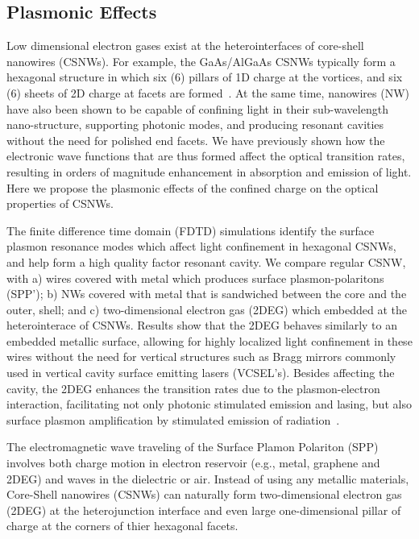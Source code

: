 \subsection{Plasmonic Effects}

Low dimensional electron gases exist at the heterointerfaces of core-shell
nanowires (CSNWs). For example, the GaAs/AlGaAs CSNWs typically form a
hexagonal structure in which six (6) pillars of 1D charge at the vortices, and
six (6) sheets of 2D charge at facets are formed~\cite{Wang:2015hz}. At the
same time, nanowires (NW) have also been shown to be capable of confining light
in their sub-wavelength nano-structure, supporting photonic modes, and
producing resonant cavities without the need for polished end facets. We have
previously shown how the electronic wave functions that are thus formed affect
the optical transition rates, resulting in orders of magnitude  enhancement in
absorption and emission of light. Here we propose the plasmonic effects of the
confined charge on the optical properties of CSNWs.

The finite difference time domain (FDTD) simulations identify the
surface plasmon resonance modes which affect light confinement in hexagonal
CSNWs, and help form a high quality factor resonant cavity. We
compare regular CSNW, with a) wires covered with metal which produces surface
plasmon-polaritons (SPP’); b) NWs covered with metal that is sandwiched between
the core and the outer, shell; and c) two-dimensional electron gas (2DEG)
which embedded at the heterointerace of CSNWs. Results show that the 2DEG
behaves similarly to an embedded metallic surface, allowing for highly
localized light confinement in these wires without the need for vertical
structures such as Bragg mirrors commonly used in vertical cavity surface
emitting lasers (VCSEL’s). Besides affecting the cavity, the 2DEG enhances  the
transition rates due to the plasmon-electron interaction, facilitating not only
photonic stimulated emission and lasing, but also  surface plasmon
amplification by stimulated emission of radiation~\cite{Bergman:2003vo}.

The electromagnetic wave traveling of the Surface Plamon Polariton (SPP)
involves both charge motion in electron reservoir (e.g., metal, graphene and
2DEG) and waves in the dielectric or air. Instead of using any metallic
materials, Core-Shell nanowires (CSNWs) can naturally form two-dimensional
electron gas (2DEG) at the heterojunction interface and even large
one-dimensional pillar of charge at the corners of thier hexagonal facets.

